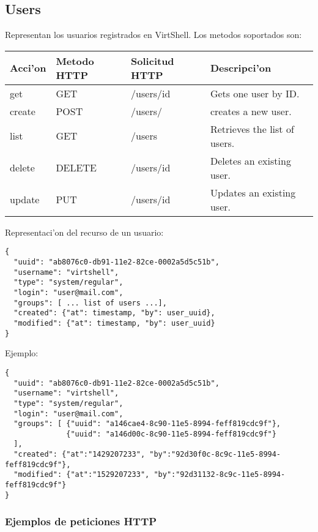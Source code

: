 \subsection{Users}
Representan los usuarios registrados en VirtShell. Los metodos soportados son:

\begin{center}
 \begin{tabular}{| l | l | l | l |}
 \hline
  \rowcolor{blueapi}
  \textbf{Acci'on} & \textbf{Metodo HTTP} & \textbf{Solicitud HTTP} & \textbf{Descripci'on} \\ [0.5ex] 
  \hline\hline
  get & GET & /users/id & Gets one user by ID. \\
  \hline
  create & POST & /users/ & creates a new user. \\
  \hline
  list & GET & /users & Retrieves the list of users. \\  
  \hline
  delete & DELETE & /users/id & Deletes an existing user. \\
  \hline  
  update & PUT & /users/id & Updates an existing user. \\ [1ex]  
  \hline
\end{tabular}
\end{center}

\vspace{1cm}
Representaci'on del recurso de un usuario:
\vspace{1cm}

\begin{lstlisting}[style=json]
{
  "uuid": "ab8076c0-db91-11e2-82ce-0002a5d5c51b",
  "username": "virtshell",
  "type": "system/regular",
  "login": "user@mail.com",
  "groups": [ ... list of users ...],
  "created": {"at": timestamp, "by": user_uuid},
  "modified": {"at": timestamp, "by": user_uuid}
}
\end{lstlisting}

Ejemplo:

\medskip
\begin{lstlisting}[style=json]
{
  "uuid": "ab8076c0-db91-11e2-82ce-0002a5d5c51b",
  "username": "virtshell",
  "type": "system/regular",
  "login": "user@mail.com",
  "groups": [ {"uuid": "a146cae4-8c90-11e5-8994-feff819cdc9f"},
              {"uuid": "a146d00c-8c90-11e5-8994-feff819cdc9f"}
  ],
  "created": {"at":"1429207233", "by":"92d30f0c-8c9c-11e5-8994-feff819cdc9f"},
  "modified": {"at":"1529207233", "by":"92d31132-8c9c-11e5-8994-feff819cdc9f"}
}
\end{lstlisting}

\subsubsection{Ejemplos de peticiones HTTP}

